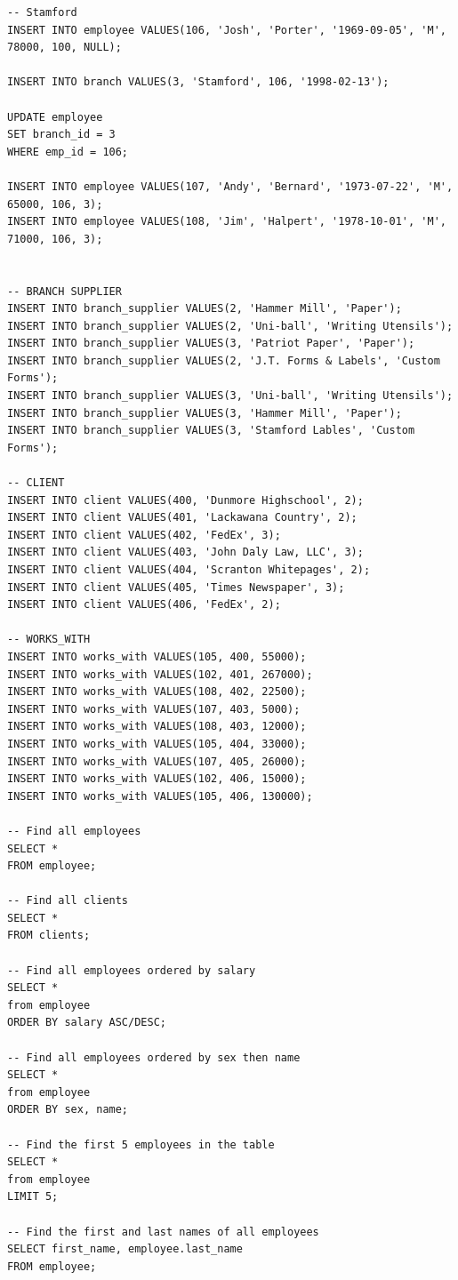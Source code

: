 \documentclass[8pt, a4paper, oneside, twocolumn]{extarticle}
\begin{document}
\begin{verbatim}
-- Stamford
INSERT INTO employee VALUES(106, 'Josh', 'Porter', '1969-09-05', 'M', 78000, 100, NULL);

INSERT INTO branch VALUES(3, 'Stamford', 106, '1998-02-13');

UPDATE employee
SET branch_id = 3
WHERE emp_id = 106;

INSERT INTO employee VALUES(107, 'Andy', 'Bernard', '1973-07-22', 'M', 65000, 106, 3);
INSERT INTO employee VALUES(108, 'Jim', 'Halpert', '1978-10-01', 'M', 71000, 106, 3);


-- BRANCH SUPPLIER
INSERT INTO branch_supplier VALUES(2, 'Hammer Mill', 'Paper');
INSERT INTO branch_supplier VALUES(2, 'Uni-ball', 'Writing Utensils');
INSERT INTO branch_supplier VALUES(3, 'Patriot Paper', 'Paper');
INSERT INTO branch_supplier VALUES(2, 'J.T. Forms & Labels', 'Custom Forms');
INSERT INTO branch_supplier VALUES(3, 'Uni-ball', 'Writing Utensils');
INSERT INTO branch_supplier VALUES(3, 'Hammer Mill', 'Paper');
INSERT INTO branch_supplier VALUES(3, 'Stamford Lables', 'Custom Forms');

-- CLIENT
INSERT INTO client VALUES(400, 'Dunmore Highschool', 2);
INSERT INTO client VALUES(401, 'Lackawana Country', 2);
INSERT INTO client VALUES(402, 'FedEx', 3);
INSERT INTO client VALUES(403, 'John Daly Law, LLC', 3);
INSERT INTO client VALUES(404, 'Scranton Whitepages', 2);
INSERT INTO client VALUES(405, 'Times Newspaper', 3);
INSERT INTO client VALUES(406, 'FedEx', 2);

-- WORKS_WITH
INSERT INTO works_with VALUES(105, 400, 55000);
INSERT INTO works_with VALUES(102, 401, 267000);
INSERT INTO works_with VALUES(108, 402, 22500);
INSERT INTO works_with VALUES(107, 403, 5000);
INSERT INTO works_with VALUES(108, 403, 12000);
INSERT INTO works_with VALUES(105, 404, 33000);
INSERT INTO works_with VALUES(107, 405, 26000);
INSERT INTO works_with VALUES(102, 406, 15000);
INSERT INTO works_with VALUES(105, 406, 130000);

-- Find all employees
SELECT *
FROM employee;

-- Find all clients
SELECT *
FROM clients;

-- Find all employees ordered by salary
SELECT *
from employee
ORDER BY salary ASC/DESC;

-- Find all employees ordered by sex then name
SELECT *
from employee
ORDER BY sex, name;

-- Find the first 5 employees in the table
SELECT *
from employee
LIMIT 5;

-- Find the first and last names of all employees
SELECT first_name, employee.last_name
FROM employee;


\end{verbatim}
\end{document}
